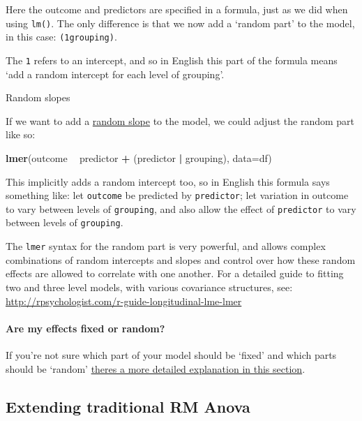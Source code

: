 \documentclass[]{article}
\newenvironment{Shaded}{\begin{snugshade}}{\end{snugshade}}
\newcommand{\DataTypeTok}[1]{\textcolor[rgb]{0.13,0.29,0.53}{#1}}
\newcommand{\KeywordTok}[1]{\textcolor[rgb]{0.13,0.29,0.53}{\textbf{#1}}}
\newcommand{\NormalTok}[1]{#1}
\newcommand{\OperatorTok}[1]{\textcolor[rgb]{0.81,0.36,0.00}{\textbf{#1}}}
\newcommand{\StringTok}[1]{\textcolor[rgb]{0.31,0.60,0.02}{#1}}
\let\oldparagraph\paragraph
\renewcommand{\paragraph}[1]{\oldparagraph{#1}\mbox{}}
\begin{document}
Here the outcome and predictors are specified in a formula, just as we did when
using \texttt{lm()}. The only difference is that we now add a `random part' to the
model, in this case: \texttt{(1\textbar{}grouping)}.

The \texttt{1} refers to an intercept, and so in English this part of the formula means
`add a random intercept for each level of grouping'.

Random slopes

If we want to add a \protect\hyperlink{random-slopes-intercepts}{random slope} to the model, we
could adjust the random part like so:

\begin{Shaded}
\begin{Highlighting}[]
\KeywordTok{lmer}\NormalTok{(outcome }\OperatorTok{~}\StringTok{ }\NormalTok{predictor }\OperatorTok{+}\StringTok{ }\NormalTok{(predictor }\OperatorTok{|}\StringTok{ }\NormalTok{grouping), }\DataTypeTok{data=}\NormalTok{df)}
\end{Highlighting}
\end{Shaded}

This implicitly adds a random intercept too, so in English this formula says
something like: let \texttt{outcome} be predicted by \texttt{predictor}; let variation in
outcome to vary between levels of \texttt{grouping}, and also allow the effect of
\texttt{predictor} to vary between levels of \texttt{grouping}.

The \texttt{lmer} syntax for the random part is very powerful, and allows complex
combinations of random intercepts and slopes and control over how these random
effects are allowed to correlate with one another. For a detailed guide to
fitting two and three level models, with various covariance structures, see:
\url{http://rpsychologist.com/r-guide-longitudinal-lme-lmer}

\hypertarget{are-my-effects-fixed-or-random}{%
\paragraph{Are my effects fixed or random?}\label{are-my-effects-fixed-or-random}}

If you're not sure which part of your model should be `fixed' and which parts
should be `random'
\protect\hyperlink{fixed-or-random}{theres a more detailed explanation in this section}.

\hypertarget{extending-traditional-rm-anova}{%
\subsection*{Extending traditional RM Anova}\label{extending-traditional-rm-anova}}
\end{document}
